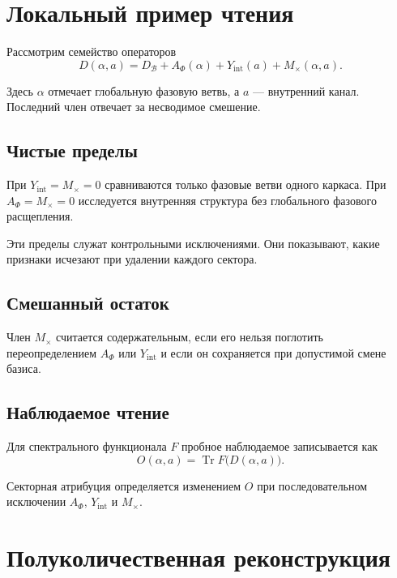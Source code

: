 \chapter{Локальный пример чтения}

Рассмотрим семейство операторов
\begin{equation}
 D(\alpha,a)=D_{\mathcal B}+A_{\Phi}(\alpha)+Y_{\mathrm{int}}(a)
 +M_{\times}(\alpha,a).
\end{equation}

Здесь $\alpha$ отмечает глобальную фазовую ветвь, а $a$ --- внутренний канал.
Последний член отвечает за несводимое смешение.

\section{Чистые пределы}

При $Y_{\mathrm{int}}=M_{\times}=0$ сравниваются только фазовые ветви одного
каркаса. При $A_{\Phi}=M_{\times}=0$ исследуется внутренняя структура без
глобального фазового расщепления.

Эти пределы служат контрольными исключениями. Они показывают, какие признаки
исчезают при удалении каждого сектора.

\section{Смешанный остаток}

Член $M_{\times}$ считается содержательным, если его нельзя поглотить
переопределением $A_{\Phi}$ или $Y_{\mathrm{int}}$ и если он сохраняется при
допустимой смене базиса.

\section{Наблюдаемое чтение}

Для спектрального функционала $F$ пробное наблюдаемое записывается как
\begin{equation}
 O(\alpha,a)=\operatorname{Tr}F\bigl(D(\alpha,a)\bigr).
\end{equation}

Секторная атрибуция определяется изменением $O$ при последовательном
исключении $A_{\Phi}$, $Y_{\mathrm{int}}$ и $M_{\times}$.

\chapter{Полуколичественная реконструкция}

